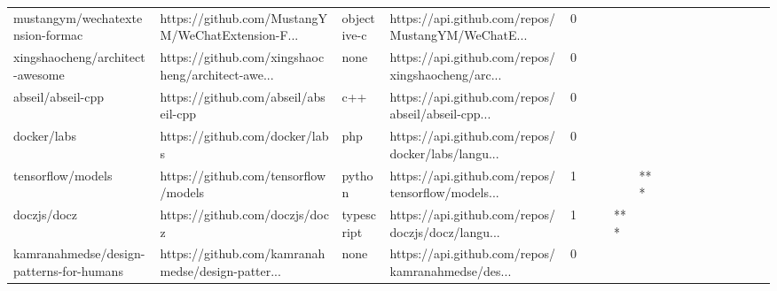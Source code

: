 \begin{tabular}{llllrlllllllllllll}
mustangym/wechatextension-formac                   &  https://github.com/MustangYM/WeChatExtension-F... &       objective-c &  https://api.github.com/repos/MustangYM/WeChatE... &       0 &         &        &           &                &                 &        &           &           &          &          &       &              &          \\
xingshaocheng/architect-awesome                    &  https://github.com/xingshaocheng/architect-awe... &              none &  https://api.github.com/repos/xingshaocheng/arc... &       0 &         &        &           &                &                 &        &           &           &          &          &       &              &          \\
abseil/abseil-cpp                                  &               https://github.com/abseil/abseil-cpp &               c++ &  https://api.github.com/repos/abseil/abseil-cpp... &       0 &         &        &           &                &                 &        &           &           &          &          &       &              &          \\
docker/labs                                        &                     https://github.com/docker/labs &               php &  https://api.github.com/repos/docker/labs/langu... &       0 &         &        &           &                &                 &        &           &           &          &          &       &              &          \\
tensorflow/models                                  &               https://github.com/tensorflow/models &            python &  https://api.github.com/repos/tensorflow/models... &       1 &         &        &           &            *** &                 &        &           &           &          &          &       &              &          \\
doczjs/docz                                        &                     https://github.com/doczjs/docz &        typescript &  https://api.github.com/repos/doczjs/docz/langu... &       1 &         &        &       *** &                &                 &        &           &           &          &          &       &              &          \\
kamranahmedse/design-patterns-for-humans           &  https://github.com/kamranahmedse/design-patter... &              none &  https://api.github.com/repos/kamranahmedse/des... &       0 &         &        &           &                &                 &        &           &           &          &          &       &              &          \\

\end{tabular}
